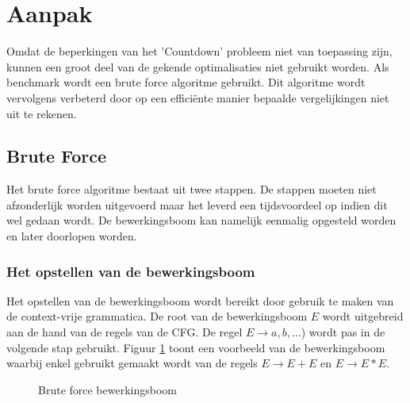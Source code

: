 \documentclass[Main.tex]{subfiles}
\begin{document}
\section{Aanpak}
Omdat de beperkingen van het 'Countdown' probleem niet van toepassing zijn, kunnen een groot deel van de gekende optimalisaties niet gebruikt worden. Als benchmark wordt een brute force algoritme gebruikt. Dit algoritme wordt vervolgens verbeterd door op een efficiënte manier bepaalde vergelijkingen niet uit te rekenen.
\subsection{Brute Force}
Het brute force algoritme bestaat uit twee stappen. De stappen moeten niet afzonderlijk worden uitgevoerd maar het leverd een tijdsvoordeel op indien dit wel gedaan wordt. De bewerkingsboom kan namelijk eenmalig opgesteld worden en later doorlopen worden.
\subsubsection*{Het opstellen van de bewerkingsboom}
Het opstellen van de bewerkingsboom wordt bereikt door gebruik te maken van de context-vrije grammatica. De root van de bewerkingsboom $E$ wordt uitgebreid aan de hand van de regels van de CFG. De regel $E \rightarrow a,b,\dotsc$) wordt pas in de volgende stap gebruikt. Figuur \ref{fig:bewerkingsboom} toont een voorbeeld van de bewerkingsboom waarbij enkel gebruikt gemaakt wordt van de regels $E \rightarrow E+E$ en $E \rightarrow E \ast E$.
\begin{figure}[!htb]
\centering
{}
\caption{Brute force bewerkingsboom} \label{fig:bewerkingsboom}
\end{figure}
\end{document}
